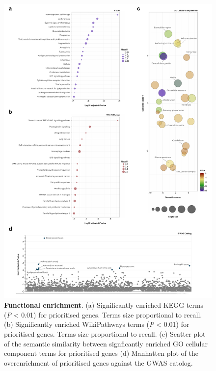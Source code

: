 \documentclass[
  11,
  a4paper,
]{article}
\begin{document}
\begin{figure}

{\centering \includegraphics{../img/Supplementary_Figure_4.png}

}

\caption{\textbf{Functional enrichment}. (a) Significantly enriched KEGG
terms (\emph{P} \textless{} 0.01) for prioritised genes. Terms size
proportional to recall. (b) Significantly enriched WikiPathways terms
(\emph{P} \textless{} 0.01) for prioritised genes. Terms size
proportional to recall. (c) Scatter plot of the semantic similarity
between signficantly enriched GO cellular component terms for
prioritised genes (d) Manhatten plot of the overenrichment of
prioritised genes against the GWAS catolog.}

\end{figure}
\end{document}
